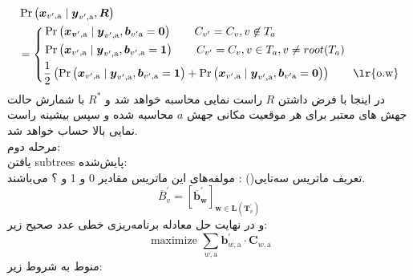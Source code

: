 \begin{equation}
	\begin{aligned}
		&\operatorname{Pr}\left(\boldsymbol{x}_{v^{\prime}, \mathrm{a}} \mid \boldsymbol{y}_{v^{\prime}, \mathrm{a}}, \boldsymbol{R}\right) \\
		&=\left\{\begin{aligned}
			&\operatorname{Pr}\left(\boldsymbol{x}_{\boldsymbol{v}^{\prime}, \mathrm{a}} \mid \boldsymbol{y}_{v^{\prime}, \mathrm{a}}, \boldsymbol{b}_{v^{\prime} \mathrm{a}}=\mathbf{0}\right) \qquad C_{v'}=C_v, v\not \in T_a\\
			&\operatorname{Pr}\left(\boldsymbol{x}_{v^{\prime}, \mathrm{a}} \mid \boldsymbol{y}_{v^{\prime}, \mathrm{a}}, \boldsymbol{b}_{v^{\prime}, \mathrm{a}}=\mathbf{1}\right) \qquad C_{v'}=C_v, v\in T_a, v\not=root(T_a)\\
			&\frac{1}{2} \left( \operatorname{Pr}\left(\boldsymbol{x}_{v^{\prime}, \mathrm{a}} \mid \boldsymbol{y}_{v^{\prime}, \mathrm{a}}, \boldsymbol{b}_{v^{\prime}, \mathrm{a}}=\mathbf{1}\right)+ \operatorname{Pr}\left(\boldsymbol{x}_{v^{\prime}, \mathrm{a}} \mid \boldsymbol{y}_{v^{\prime}, \mathrm{a}}, \boldsymbol{b}_{v^{\prime} \mathrm{a}}=\mathbf{0}\right)\right) \qquad \text{\lr{o.w}}
		\end{aligned}\right.
	\end{aligned}
\end{equation}
در اینجا با فرض داشتن $R$ راست نمایی محاسبه خواهد شد و  $R^*$ با شمارش حالت جهش های معتبر برای هر موقعیت مکانی جهش $a$ محاسبه شده و سپس بیشینه راست نمایی بالا حساب خواهد شد. 
\\
مرحله دوم:  
\\
یافتن \gls{subtrees} پایش‌شده: 
\\
تعریف ماتریس سه‌تایی() : مولفه‌های این ماتریس مقادیر 0 و 1 و ؟ می‌باشند.
\begin{equation}
	\overline{B}_{v}^{\prime}=\left[\overline{\boldsymbol{b}}_{\boldsymbol{w}}^{\prime}\right]_{\boldsymbol{w} \in \boldsymbol{L}\left(\boldsymbol{T}_{v}^{\prime}\right)}
\end{equation}
و در نهایت حل معادله برنامه‌ریزی خطی عدد صحیح زیر:
\begin{equation}
	\text { maximize } \sum_{w, \mathrm{a}} \boldsymbol{b}_{w, \mathrm{a}}^{\prime} \cdot \boldsymbol{C}_{w, \mathrm{a}}
\end{equation}
منوط به شروط زیر: 
